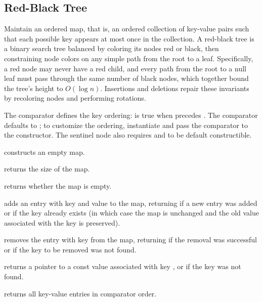 \subsection{Red-Black Tree}
\label{sec:2.4.3}
Maintain an ordered map, that is, an ordered collection of key-value pairs such that each possible key appears at most once in the collection. A red-black tree is a binary search tree balanced by coloring its nodes red or black, then constraining node colors on any simple path from the root to a leaf. Specifically, a red node may never have a red child, and every path from the root to a null leaf must pass through the same number of black nodes, which together bound the tree's height to $O(\log n)$. Insertions and deletions repair these invariants by recoloring nodes and performing rotations.

The comparator  defines the key ordering:  is true when  precedes . The comparator defaults to ; to customize the ordering, instantiate  and pass the comparator to the constructor. The sentinel node also requires  and  to be default constructible.

\begin{compactitem}
  \item {} constructs an empty map.
  \item {} returns the size of the map.
  \item {} returns whether the map is empty.
  \item {} adds an entry with key  and value  to the map, returning  if a new entry was added or  if the key already exists (in which case the map is unchanged and the old value associated with the key is preserved).
  \item {} removes the entry with key  from the map, returning  if the removal was successful or  if the key to be removed was not found.
  \item {} returns a pointer to a const value associated with key , or  if the key was not found.
  \item {} returns all key-value entries in comparator order.
\end{compactitem}

